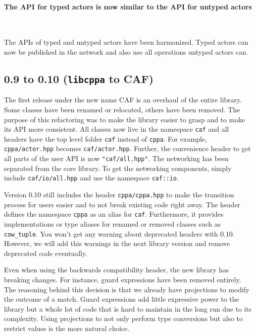 \paragraph{The API for typed actors is now similar to the API for untyped actors}

~

The APIs of typed and untyped actors have been harmonized. Typed actors can now
be published in the network and also use all operations untyped actors can.

\clearpage
\subsection{0.9 to 0.10 (\texttt{libcppa} to CAF)}

The first release under the new name CAF is an overhaul of the entire library.
Some classes have been renamed or relocated, others have been removed. The
purpose of this refactoring was to make the library easier to grasp and to make
its API more consistent. All classes now live in the namespace \texttt{caf} and
all headers have the top level folder \texttt{caf} instead of \texttt{cppa}.
For example, \texttt{cppa/actor.hpp} becomes \texttt{caf/actor.hpp}. Further,
the convenience header to get all parts of the user API is now
\texttt{"caf/all.hpp"}. The networking has been separated from the core
library. To get the networking components, simply include
\texttt{caf/io/all.hpp} and use the namespace \lstinline^caf::io^.

Version 0.10 still includes the header \texttt{cppa/cppa.hpp} to make the
transition process for users easier and to not break existing code right away.
The header defines the namespace \texttt{cppa} as an alias for \texttt{caf}.
Furthermore, it provides implementations or type aliases for renamed or removed
classes such as \lstinline^cow_tuple^. You won't get any warning about deprecated
headers with 0.10. However, we will add this warnings in the next library
version and remove deprecated code eventually.

Even when using the backwards compatibility header, the new library has
breaking changes. For instance, guard expressions have been removed entirely.
The reasoning behind this decision is that we already have projections to
modify the outcome of a match. Guard expressions add little expressive power to
the library but a whole lot of code that is hard to maintain in the long run
due to its complexity. Using projections to not only perform type conversions
but also to restrict values is the more natural choice.

